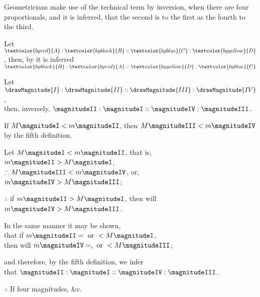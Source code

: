 \label{def:V.XIV} 
\def\varA{\textcolor{byred}{A}}
\def\varB{\textcolor{byblack}{B}}
\def\varC{\textcolor{byblue}{C}}
\def\varD{\textcolor{byyellow}{D}}
Geometricians make use of the technical term  by inversion, when there are four proportionals, and it is inferred, that the second is to the first as the fourth to the third.

Let $\varA : \varB :: \varC : \varD$, then, by  it is inferred $\varB : \varA :: \varD : \varC$

\vfill\pagebreak

\label{prop:V.B} %

\begin{center}
Let $\drawMagnitude{I} : \drawMagnitude{II} :: \drawMagnitude{III} : \drawMagnitude{IV}$,\\
then, inversely, $\magnitudeII : \magnitudeI :: \magnitudeIV : \magnitudeIII$.

If $M \magnitudeI < m \magnitudeII$, then $M \magnitudeIII < m \magnitudeIV$\\
by the fifth definition.

Let $M \magnitudeI < m \magnitudeII$, that is, $m \magnitudeII > M \magnitudeI$,\\
$\therefore M \magnitudeIII < m \magnitudeIV$, or, $m \magnitudeIV > M \magnitudeIII$;

$\therefore$ if $m \magnitudeII > M \magnitudeI$, then will $m \magnitudeIV > M \magnitudeIII$.

In the same manner it may be shown,\\
that if $m \magnitudeII = \mbox{ or } < M \magnitudeI$,\\
then will $m \magnitudeIV =, \mbox{ or } < M \magnitudeIII$;

and therefore, by the fifth definition, we infer\\
that $\magnitudeII : \magnitudeI :: \magnitudeIV : \magnitudeIII$.

$\therefore$ If four magnitudes, \&c.
\end{center}


\vfill\pagebreak

